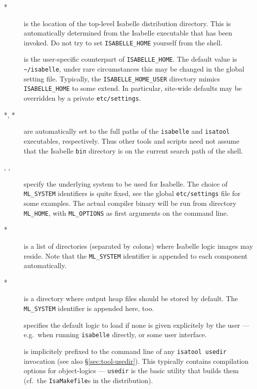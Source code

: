 \begin{description}
\item[*] is the location of the top-level
  Isabelle distribution directory. This is automatically determined
  from the Isabelle executable that has been invoked.  Do not try to
  set \texttt{ISABELLE_HOME} yourself from the shell.
  
\item[] is the user-specific counterpart of
  \texttt{ISABELLE_HOME}. The default value is
  \texttt{\~\relax/isabelle}, under rare circumstances this may be
  changed in the global setting file.  Typically, the
  \texttt{ISABELLE_HOME_USER} directory mimics \texttt{ISABELLE_HOME}
  to some extend. In particular, site-wide defaults may be overridden
  by a private \texttt{etc/settings}.
  
\item[*, *] are automatically set to
  the full paths of the \texttt{isabelle} and \texttt{isatool}
  executables, respectively.  Thus other tools and scripts need not
  assume that the Isabelle \texttt{bin} directory is on the current
  search path of the shell.

\item[, , ]
  specify the underlying {\ML} system to be used for Isabelle.  The
  choice of \texttt{ML_SYSTEM} identifiers is quite fixed, see the
  global \texttt{etc/settings} file for some examples. The actual
  compiler binary will be run from directory \texttt{ML_HOME}, with
  \texttt{ML_OPTIONS} as first arguments on the command line.
  
\item[*] is a list of directories (separated by
  colons) where Isabelle logic images may reside. Note that the
  \texttt{ML_SYSTEM} identifier is appended to each component
  automatically.
  
\item[*] is a directory where output heap
  files should be stored by default. The \texttt{ML_SYSTEM} identifier
  is appended here, too.

\item[] specifies the default logic to load if
  none is given explicitely by the user --- e.g.\ when running
  \texttt{isabelle} directly, or some user interface.

\item[] is implicitely prefixed to the
  command line of any \texttt{isatool usedir} invocation (see also
  \S\ref{sec:tool-usedir}). This typically contains compilation
  options for object-logics --- \texttt{usedir} is the basic utility
  that builds them (cf.\ the \texttt{IsaMakefile}s in the
  distribution).


\end{description}

